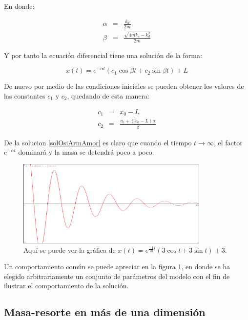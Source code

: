 En donde:

\begin{eqnarray}
\alpha & = & \frac{k_d}{2m} \nonumber \\
\beta  & = & \frac{\sqrt{4 m k_s - k_d^2}}{2m} \nonumber
\end{eqnarray}

Y por tanto la ecuación diferencial tiene una solución de la forma:

\begin{equation}
\label{solOsiArmAmor} 
x(t) = e^{-\alpha t} \left( c_1 \cos{\beta t} + c_2 \sin{\beta t} \right) + L
\end{equation}

De nuevo por medio de las condiciones iniciales se pueden obtener los valores de las constantes $c_1$ y $c_2$, quedando de esta manera:

\begin{eqnarray}
c_1 & = & x_0 - L \nonumber \\
c_2 & = & \frac{v_0 + \left( x_0 - L \right) \alpha }{\beta } \nonumber 
\end{eqnarray}

De la solucion \ref{solOsiArmAmor} es claro que cuando el tiempo $t \rightarrow \infty $, el factor $e^{-\alpha t}$ dominará y la masa se detendrá poco a poco.

\begin{figure}
 \centering
 \includegraphics[width=0.85\textwidth]{Img/oscilador_amortiguado}
 \caption[Plano fase del oscilador armónico amortiguado]{ 
 Aquí se puede ver la gráfica de $x(t) = e^{\frac{-1}{10}t} \left( 3 \cos{t} + 3 \sin{t} \right) + 3$.
 } \label{OsciAmor:fig}
\end{figure}


Un comportamiento común se puede apreciar en la figura \ref{OsciAmor:fig}, en donde se ha elegido arbitrariamente un conjunto de parámetros del modelo con el fin de ilustrar el comportamiento de la solución.

\subsection{Masa-resorte en más de una dimensión}

